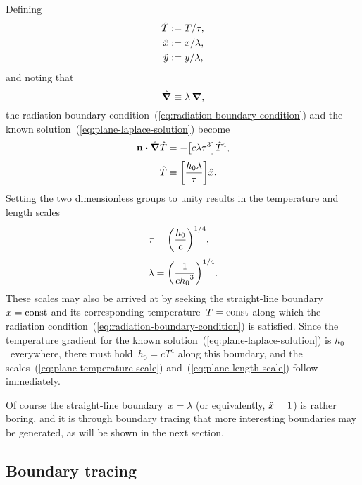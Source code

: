 Defining
\begin{align}
  \hat{T} &:= T / \tau, \label{eq:plane-scaled-temperature} \\
  \hat{x} &:= x / \lambda, \label{eq:plane-scaled-x} \\
  \hat{y} &:= y / \lambda, \label{eq:plane-scaled-y}
\end{align}
and noting that
\begin{equation}
  \mathop{}\!\hat{\mathop{}\!\boldsymbol{\mathbf{\nabla}}} \equiv \lambda \mathop{}\!\boldsymbol{\mathbf{\nabla}},
  \label{eq:plane-scaled-del}
\end{equation}
the radiation boundary condition~(\ref{eq:radiation-boundary-condition})
and the known solution~(\ref{eq:plane-laplace-solution})
become
\begin{align}
  \normalvec \dotp \scaleddel \scaled{T}
    &= -\group{c \lambda \tau^3} \scaled{T}^4,
    \label{eq:plane-scaled-radiation-boundary-condition-with-groups}
    \\[\tallspace]
  \scaled{T}
    &\ideq \group{\frac{h_0 \lambda}{\tau}} \scaled{x}.
    \label{eq:plane-scaled-laplace-solution-with-groups}
\end{align}
Setting the two dimensionless groups to unity
results in the temperature and length scales
\begin{align}
  \tau &= \roundbr*{\frac{h_0}{c}}^{1/4},
    \label{eq:plane-temperature-scale} \\[\tallspace]
  \lambda &= \roundbr*{\frac{1}{c {h_0}^3}}^{1/4}.
    \label{eq:plane-length-scale}
\end{align}
These scales may also be arrived at
by seeking the straight-line boundary~$x = \mathrm{const}$
and its corresponding temperature~$T = \mathrm{const}$
along which the radiation condition~(\ref{eq:radiation-boundary-condition})
is satisfied.
Since the temperature gradient
for the known solution~(\ref{eq:plane-laplace-solution})
is $h_0$~everywhere,
there must hold~$h_0 = c T^4$ along this boundary,
and the scales~(\ref{eq:plane-temperature-scale})
and~(\ref{eq:plane-length-scale}) follow immediately.

Of course the straight-line boundary~$x = \lambda$
(or equivalently, $\hat{x} = 1$)
is rather boring,
and it is through boundary tracing
that more interesting boundaries may be generated,
as will be shown in the next section.

\subsection{Boundary tracing}
\label{sec:cartesian.plane.tracing}

